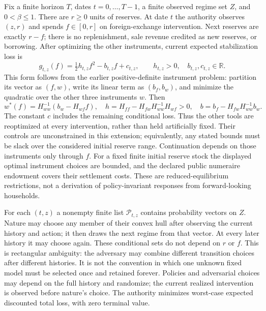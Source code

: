 \documentclass[11pt]{article}
\theoremstyle{definition}
\begin{document}
Fix a finite horizon $T$, dates $t=0,\ldots,T-1$, a finite observed regime
set $Z$, and $0<\beta\leq1$. There are $r\geq0$ units of reserves.
At date $t$ the authority observes $(z,r)$ and spends $f\in[0,r]$ on
foreign-exchange intervention. Next reserves are exactly $r-f$; there is
no replenishment, sale revenue credited as new reserves, or borrowing.
After optimizing the other instruments, current expected stabilization
loss is
\[
 g_{t,z}(f)=\tfrac12 h_{t,z}f^2-b_{t,z}f+c_{t,z},
 \qquad h_{t,z}>0,\quad b_{t,z},c_{t,z}\in\mathbb R.
\]
This form follows from the earlier positive-definite instrument problem:
partition its vector as $(f,w)$, write its linear term as $(b_f,b_w)$,
and minimize the quadratic over the other three instruments $w$. Then
\[
 w^*(f)=H_{ww}^{-1}(b_w-H_{wf}f),\quad
 h=H_{ff}-H_{fw}H_{ww}^{-1}H_{wf}>0,\quad
 b=b_f-H_{fw}H_{ww}^{-1}b_w.
\]
The constant $c$ includes the remaining conditional loss. Thus the other
tools are reoptimized at every intervention, rather than held artificially
fixed. Their controls are unconstrained in this extension; equivalently,
any stated bounds must be slack over the considered initial reserve range.
Continuation depends on those instruments only through $f$. For a fixed
finite initial reserve stock the displayed optimal instrument choices are
bounded, and the declared public numeraire endowment covers their settlement
costs. These are reduced-equilibrium restrictions, not a derivation of
policy-invariant responses from forward-looking households.

For each $(t,z)$ a nonempty finite list $\mathcal P_{t,z}$ contains
probability vectors on $Z$. Nature may choose any member of their convex
hull after observing the current history and action; it then draws the
next regime from that vector. At every later history it may choose again.
These conditional sets do not depend on $r$ or $f$. This is rectangular
ambiguity: the adversary may combine different transition choices after
different histories. It is not the convention in which one unknown fixed
model must be selected once and retained forever. Policies and adversarial
choices may depend on the full history and randomize; the current realized
intervention is observed before nature's choice. The authority minimizes
worst-case expected discounted total loss, with zero terminal value.
\end{document}

